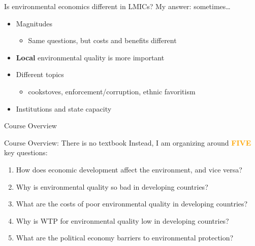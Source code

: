 \documentclass[
  ignorenonframetext,
  aspectratio=169]{beamer}
\providecommand{\tightlist}{%
  \setlength{\itemsep}{0pt}\setlength{\parskip}{0pt}}
\begin{document}
\begin{frame}{Is environmental economics different in LMICs?}
\protect\hypertarget{is-environmental-economics-different-in-lmics}{}
My answer: sometimes\ldots{} \vfill 

\begin{itemize}
\item
  Magnitudes

  \begin{itemize}
  \tightlist
  \item
    Same questions, but costs and benefits different
  \end{itemize}
\item
  \textbf{Local} environmental quality is more important
\item
  Different topics

  \begin{itemize}
  \tightlist
  \item
    cookstoves, enforcement/corruption, ethnic favoritism
  \end{itemize}
\item
  Institutions and state capacity
\end{itemize}
\end{frame}

\begin{frame}{}
\protect\hypertarget{section-1}{}
\centering

\huge Course Overview
\end{frame}

\begin{frame}{Course Overview: There is no textbook}
\protect\hypertarget{course-overview-there-is-no-textbook}{}
Instead, I am organizing around \textbf{\textcolor{orange}{FIVE}} key
questions:

\begin{enumerate}
\item
  How does economic development affect the environment, and vice versa?
\item
  Why is environmental quality so bad in developing countries?
\item
  What are the costs of poor environmental quality in developing
  countries?
\item
  Why is WTP for environmental quality low in developing countries?
\item
  What are the political economy barriers to environmental protection?
\end{enumerate}
\end{frame}
\end{document}
